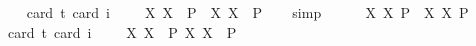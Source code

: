 \begin{isabellebody}
\ \ \isamarkupfalse%
{\isacharbrackleft}card\ {\isacharprime}t{\isacharequal}{}{\isacharcomma}\ card\ i{\isacharequal}{}{\isacharbrackright}%
\isadelimproof
\ %
\endisadelimproof
%
\isatagproof
{}\isamarkupfalse%
\ %
%
\endisatagproof
{\isafoldproof}%
%
\isadelimproof
%
\endisadelimproof
\isanewline
{}\isamarkupfalse%
\ {\isachardoublequoteopen}{\isasymlfloor}{\isacharparenleft}{\isasymlambda}X{\isachardot}\ \isactrlbold {\isasymdiamond}\isactrlbold {\isasymexists}X{\isacharparenright}\ \ {\isacharparenleft}P{\isacharcolon}{\isacharcolon}{\isasymup}{\isasymlangle}{\isasymlangle}{\isasymzero}{\isasymrangle}{\isasymrangle}{\isacharparenright}\ \isactrlbold {\isasymrightarrow}\ \isactrlbold {\isasymdiamond}{\isacharparenleft}{\isacharparenleft}{\isasymlambda}X{\isachardot}\ \isactrlbold {\isasymexists}X{\isacharparenright}\ \ P{\isacharparenright}{\isasymrfloor}{\isachardoublequoteclose}%
\isadelimproof
\ \ %
\endisadelimproof
%
\isatagproof
{}\isamarkupfalse%
\ simp%
\endisatagproof
{\isafoldproof}%
%
\isadelimproof
%
\endisadelimproof
\ \ \ \ \isanewline
{}\isamarkupfalse%
\ {\isachardoublequoteopen}{\isasymlfloor}{\isacharparenleft}{\isasymlambda}X{\isachardot}\ \isactrlbold {\isasymdiamond}\isactrlbold {\isasymexists}X{\isacharparenright}\ \isactrlbold {\isasymdown}{\isacharparenleft}P{\isacharcolon}{\isacharcolon}{\isasymup}{\isasymlangle}{\isasymlangle}{\isasymzero}{\isasymrangle}{\isasymrangle}{\isacharparenright}\ \isactrlbold {\isasymrightarrow}\ \isactrlbold {\isasymdiamond}{\isacharparenleft}{\isacharparenleft}{\isasymlambda}X{\isachardot}\ \isactrlbold {\isasymexists}X{\isacharparenright}\ \isactrlbold {\isasymdown}P{\isacharparenright}{\isasymrfloor}{\isachardoublequoteclose}\ \isanewline
\ \ \isamarkupfalse%
{\isacharbrackleft}card\ {\isacharprime}t{\isacharequal}{}{\isacharcomma}\ card\ i{\isacharequal}{}{\isacharbrackright}%
\isadelimproof
\ %
\endisadelimproof
%
\isatagproof
{}\isamarkupfalse%
\ %
%
\endisatagproof
{\isafoldproof}%
%
\isadelimproof
%
\endisadelimproof
\isanewline
{}\isamarkupfalse%
\ {\isachardoublequoteopen}{\isasymlfloor}{\isacharparenleft}{\isasymlambda}X{\isachardot}\ \isactrlbold {\isasymdiamond}\isactrlbold {\isasymexists}X{\isacharparenright}\ \ {\isacharparenleft}P{\isacharcolon}{\isacharcolon}{\isasymup}{\isasymlangle}{\isasymup}{\isasymlangle}{\isasymzero}{\isasymrangle}{\isasymrangle}{\isacharparenright}\isactrlbold {\isasymrightarrow}\ \isactrlbold {\isasymdiamond}{\isacharparenleft}{\isacharparenleft}{\isasymlambda}X{\isachardot}\ \isactrlbold {\isasymexists}X{\isacharparenright}\ \ P{\isacharparenright}{\isasymrfloor}{\isachardoublequoteclose}%

\end{isabellebody}

